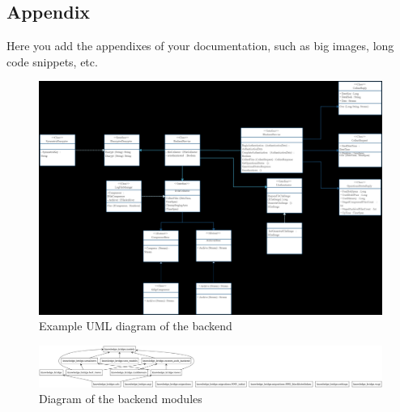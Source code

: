 \documentclass[12pt,a4paper]{article}
\begin{document}
\begin{spacing}{1.5}
    \section{Appendix}
    Here you add the appendixes of your documentation, such as big images, long
    code snippets, etc.
    \begin{figure}[H]
        \centering
        \includegraphics[width=1\linewidth]{assets/backend-uml-example.png}
        \caption{Example UML diagram of the backend}
        \label{fig:backend-uml}
    \end{figure}
    \FloatBarrier

    \begin{figure}[H]
        \centering
        \includegraphics[width=1\linewidth]{assets/KnowledgeBridgePackages.png}
        \caption{Diagram of the backend modules}
        \label{fig:backend-modules}
    \end{figure}
    \FloatBarrier

\end{spacing}
\end{document}
